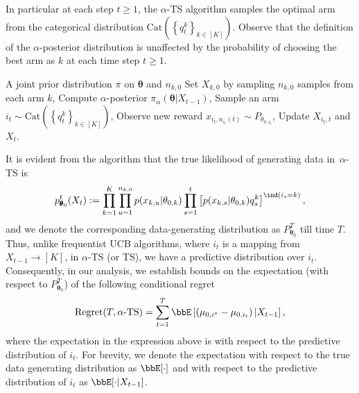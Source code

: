 \documentclass[11pt]{article}
\begin{document}
 In particular at each step $t\geq 1$, the $\alpha$-TS algorithm samples the optimal arm from the categorical distribution $\text{Cat}\left( \left\{q_t^k \right\}_{k\in [K]} \right) $.
 Observe that the definition of the $\alpha$-posterior distribution is unaffected by the probability of choosing the best arm as $k$ at each time step $t\geq 1$. 
 
\begin{algorithm}
     \caption{$\alpha$-Thompson Sampling}\label{alg:TS}
    \begin{algorithmic}[1]
    \Require A joint prior distribution $\pi$ on $\pmb \theta$ and $n_{k,0}$ 
    \State Set $X_{k,0}$ by sampling $n_{k,0}$ samples from each arm $k$, 
        \State Compute $\alpha$-posterior $\pi_{\alpha}(\pmb \theta|X_{t-1})$,
        \State Sample an arm $i_t \sim  \text{Cat}\left( \left\{q_t^k \right\}_{k\in [K]} \right) $,%
        \State Observe new reward $x_{i_t,n_{i_t}(t)}\sim P_{\theta_{0,i_t}}$,
        \State Update $X_{i_t,t}$ and $X_t$.
    \EndFor
    \end{algorithmic}
\end{algorithm}
It is evident from the algorithm that the true likelihood of generating data in~$\alpha$-TS is \begin{align}
    p_{\pmb \theta_0}^t(X_t) := \prod_{k=1}^{K} \prod_{u=1}^{n_{k,0}} p(x_{k,u}|\theta_{0,k})\prod_{s=1}^{t}\left[p(x_{
    k,s}|\theta_{0,k})q_s^k \right]^{ \ind(i_s=k)},
\end{align}
and we denote the corresponding data-generating distribution as $P_{\pmb \theta_0}^T$ till time $T$.
Thus, unlike frequentist UCB algorithms, where $i_t$ is a mapping from $X_{t-1}\to [K]$, in $\alpha$-TS (or TS), we have a predictive distribution over $i_t$. %
Consequently, in our analysis, we establish bounds on the expectation (with respect to $P_{\pmb \theta_0}^T$) of the following conditional regret
\begin{align}
    \text{Regret}(T, \text{$\alpha$-TS} ) =  \sum_{t=1}^{T}  \bbE \left[\left(\mu_{0,i^*} - \mu_{0,i_t} \right) |X_{t-1}\right],
    \label{eq:TS-regret}
\end{align}  
where the expectation in the expression above is with respect to the predictive distribution of $i_t$.
For brevity, we denote the expectation with respect to the true data generating distribution as $\bbE[\cdot]$ and with respect to the predictive distribution of $i_t$ as $\bbE[\cdot|X_{t-1}]$.
\end{document}
